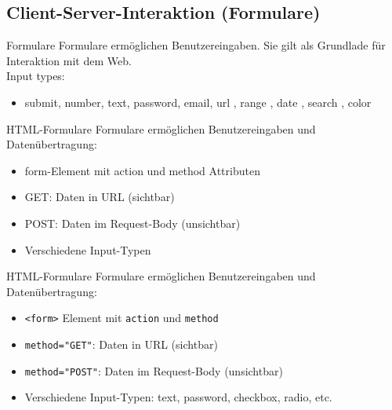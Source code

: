 \subsection{Client-Server-Interaktion (Formulare)}

\begin{definition}{Formulare}
Formulare ermöglichen Benutzereingaben. Sie gilt als Grundlade für Interaktion mit dem Web.\\
Input types:

\begin{itemize}
\item submit, number, text, password, email, url , range , date , search , color
\end{itemize}
\end{definition}

\begin{definition}{HTML-Formulare}
    Formulare ermöglichen Benutzereingaben und Datenübertragung:
    \begin{itemize}
        \item form-Element mit action und method Attributen
        \item GET: Daten in URL (sichtbar)
        \item POST: Daten im Request-Body (unsichtbar)
        \item Verschiedene Input-Typen
    \end{itemize}
\end{definition}

\begin{definition}{HTML-Formulare}
    Formulare ermöglichen Benutzereingaben und Datenübertragung:
    \begin{itemize}
        \item \texttt{<form>} Element mit \texttt{action} und \texttt{method}
        \item \texttt{method="GET"}: Daten in URL (sichtbar)
        \item \texttt{method="POST"}: Daten im Request-Body (unsichtbar)
        \item Verschiedene Input-Typen: text, password, checkbox, radio, etc.
    \end{itemize}
\end{definition}

